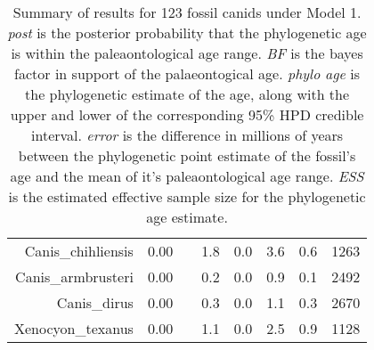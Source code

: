 \begin{table}[ht]
\begin{tabular}{rrrrrrrr}
  Canis\_chihliensis & 0.00 &  & 1.8 & 0.0 & 3.6 & 0.6 & 1263 \\ 
  Canis\_armbrusteri & 0.00 &  & 0.2 & 0.0 & 0.9 & 0.1 & 2492 \\ 
  Canis\_dirus & 0.00 &  & 0.3 & 0.0 & 1.1 & 0.3 & 2670 \\ 
  Xenocyon\_texanus & 0.00 &  & 1.1 & 0.0 & 2.5 & 0.9 & 1128 \\ 
   \hline
\end{tabular}
\caption{Summary of results for 123 fossil canids under Model 1. {\em post} is the posterior probability that the phylogenetic age is within the paleaontological age range. {\em BF} is the bayes factor in support of the palaeontogical age. {\em phylo age} is the phylogenetic estimate of the age, along with the upper and lower of the corresponding 95\% HPD credible interval. {\em error} is the difference in millions of years between the phylogenetic point estimate of the fossil's age and the mean of it's paleaontological age range. {\em ESS} is the estimated effective sample size for the phylogenetic age estimate.} 
\label{fossilTable_c}
\end{table}
